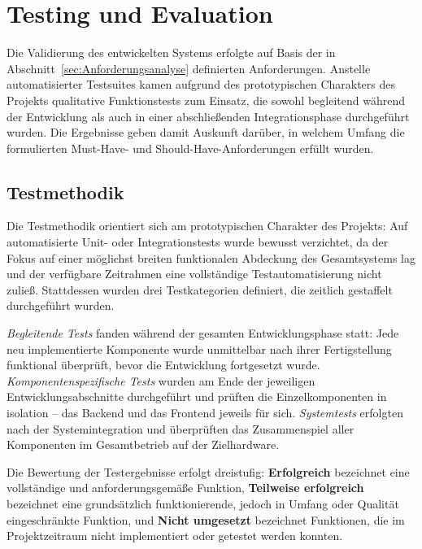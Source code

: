 

\chapter{Testing und Evaluation}
\label{chap:TestingundEvaluation}

Die Validierung des entwickelten Systems erfolgte auf Basis der in
Abschnitt~\ref{sec:Anforderungsanalyse} definierten Anforderungen.
Anstelle automatisierter Testsuites kamen aufgrund des prototypischen Charakters
des Projekts qualitative Funktionstests zum Einsatz, die sowohl begleitend während
der Entwicklung als auch in einer abschließenden Integrationsphase durchgeführt wurden.
Die Ergebnisse geben damit Auskunft darüber, in welchem Umfang die formulierten
Must-Have- und Should-Have-Anforderungen erfüllt wurden.

\section{Testmethodik}
\label{sec:testmethodik}

Die Testmethodik orientiert sich am prototypischen Charakter des Projekts:
Auf automatisierte Unit- oder Integrationstests wurde bewusst verzichtet, da der
Fokus auf einer möglichst breiten funktionalen Abdeckung des Gesamtsystems lag und
der verfügbare Zeitrahmen eine vollständige Testautomatisierung nicht zuließ.
Stattdessen wurden drei Testkategorien definiert, die zeitlich gestaffelt durchgeführt
wurden.

\emph{Begleitende Tests} fanden während der gesamten Entwicklungsphase statt:
Jede neu implementierte Komponente wurde
unmittelbar nach ihrer Fertigstellung funktional überprüft, bevor die Entwicklung
fortgesetzt wurde.
\emph{Komponentenspezifische Tests} wurden am Ende der jeweiligen Entwicklungsabschnitte
durchgeführt und prüften die Einzelkomponenten in isolation -- das Backend und das Frontend jeweils für sich.
\emph{Systemtests} erfolgten nach der Systemintegration und überprüften das
Zusammenspiel aller Komponenten im Gesamtbetrieb auf der Zielhardware.

Die Bewertung der Testergebnisse erfolgt dreistufig:
\textbf{Erfolgreich} bezeichnet eine vollständige und anforderungsgemäße Funktion,
\textbf{Teilweise erfolgreich} bezeichnet eine grundsätzlich funktionierende, jedoch
in Umfang oder Qualität eingeschränkte Funktion, und
\textbf{Nicht umgesetzt} bezeichnet Funktionen, die im Projektzeitraum nicht
implementiert oder getestet werden konnten.

